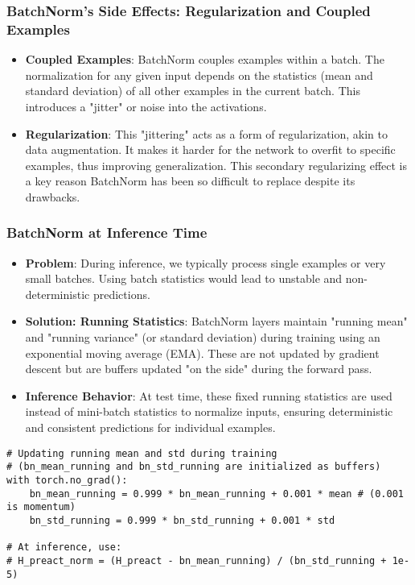 \subsubsection{BatchNorm's Side Effects: Regularization and Coupled Examples}
\begin{itemize}
    \item \textbf{Coupled Examples}: BatchNorm couples examples within a batch. The normalization for any given input depends on the statistics (mean and standard deviation) of all other examples in the current batch. This introduces a "jitter" or noise into the activations.
    \item \textbf{Regularization}: This "jittering" acts as a form of regularization, akin to data augmentation. It makes it harder for the network to overfit to specific examples, thus improving generalization. This secondary regularizing effect is a key reason BatchNorm has been so difficult to replace despite its drawbacks.
\end{itemize}

\subsubsection{BatchNorm at Inference Time}
\begin{itemize}
    \item \textbf{Problem}: During inference, we typically process single examples or very small batches. Using batch statistics would lead to unstable and non-deterministic predictions.
    \item \textbf{Solution: Running Statistics}: BatchNorm layers maintain "running mean" and "running variance" (or standard deviation) during training using an exponential moving average (EMA). These are not updated by gradient descent but are buffers updated "on the side" during the forward pass.
    \item \textbf{Inference Behavior}: At test time, these fixed running statistics are used instead of mini-batch statistics to normalize inputs, ensuring deterministic and consistent predictions for individual examples.
\end{itemize}

\begin{lstlisting}
# Updating running mean and std during training
# (bn_mean_running and bn_std_running are initialized as buffers)
with torch.no_grad():
    bn_mean_running = 0.999 * bn_mean_running + 0.001 * mean # (0.001 is momentum)
    bn_std_running = 0.999 * bn_std_running + 0.001 * std

# At inference, use:
# H_preact_norm = (H_preact - bn_mean_running) / (bn_std_running + 1e-5)
\end{lstlisting}

